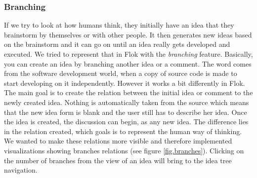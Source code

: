 \documentclass[a4paper,12pt, oneside]{article}
\begin{document}
\subsubsection{Branching}
\label{sec.branching}
If we try to look at how humans think, they initially have an idea that they brainstorm by themselves or with other people.
It then generates new ideas based on the brainstorm and it can go on until an idea really gets developed and executed.
We tried to represent that in Flok with the \emph{branching} feature.
Basically, you can create an idea by branching another idea or a comment.
The word comes from the software development world, when a copy of source code is made to start developing on it independently.
However it works a bit differently in Flok.
The main goal is to create the relation between the initial idea or comment to the newly created idea.
Nothing is automatically taken from the source which means that the new idea form is blank and the user still has to describe her idea.
Once the idea is created, the discussion can begin, as any new idea.
The difference lies in the relation created, which goals is to represent the human way of thinking.
We wanted to make these relations more visible and therefore implemented visualizations showing branches relations (see figure \ref{fig.branches}).
Clicking on the number of branches from the view of an idea will bring to the idea tree navigation.
\end{document}

